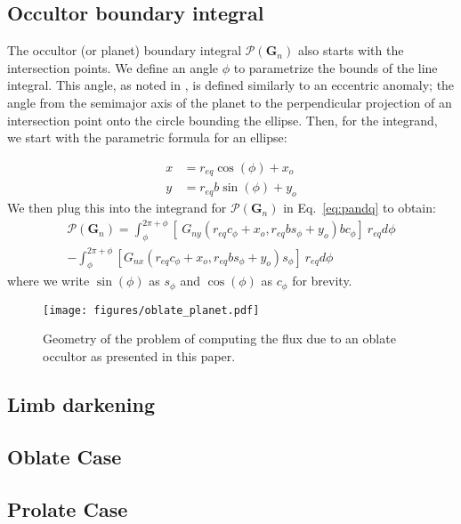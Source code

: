 \documentclass[twocolumn]{aastex631}
\begin{document}
\subsection{Occultor boundary integral}
The occultor (or planet) boundary integral $\mathcal{P}(\mathbf{G}_n)$ also starts with the intersection points. We define an angle $\phi$ to parametrize the bounds of the line integral. This angle, as noted in \citet{dholakia2022}, is defined similarly to an eccentric anomaly; the angle from the semimajor axis of the planet to the perpendicular projection of an intersection point onto the circle bounding the ellipse. Then, for the integrand, we start with the parametric formula for an ellipse:

\begin{align}
    x &= r_{eq} \cos(\phi) + x_o \\
    y &= r_{eq} b \sin(\phi) + y_o
\end{align}
We then plug this into the integrand for $\mathcal{P}(\mathbf{G}_n)$ in Eq.~\ref{eq:pandq} to obtain:
\begin{align}
\mathcal{P}(\mathbf{G}_n) = \int_{\phi}^{2\pi + \phi}[\ G_{ny}(r_{eq} c_\phi + x_o , r_{eq} b s_\phi + y_o) b c_\phi] \ r_{eq} d\phi \\
- \int_{\phi}^{2\pi + \phi}[G_{nx}(r_{eq} c_\phi + x_o, r_{eq} b s_\phi + y_o)s_\phi]\ r_{eq} d\phi
\end{align}
where we write $\sin{(\phi)}$ as $s_\phi$ and $\cos{(\phi)}$ as $c_\phi$ for brevity.
\begin{figure}[ht!]
    \begin{centering}
        \texttt{[image: figures/oblate\_planet.pdf]}
        \caption{Geometry of the problem of computing the flux due to an oblate occultor as presented in this paper. 
        }
        \label{fig:integral_bounds}
    \end{centering}
\end{figure}

\subsection{Limb darkening}
\subsection{Oblate Case}
\subsection{Prolate Case}
\end{document}
